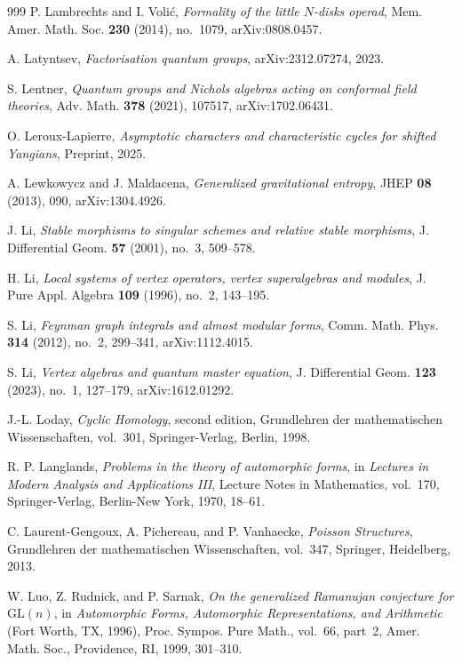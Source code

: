 \begin{thebibliography}{999}
P. Lambrechts and I. Voli\'c, \emph{Formality of the little $N$-disks operad}, Mem. Amer. Math. Soc. \textbf{230} (2014), no.~1079, arXiv:0808.0457.

A. Latyntsev, \emph{Factorisation quantum groups}, arXiv:2312.07274, 2023.

S. Lentner, \emph{Quantum groups and Nichols algebras acting on conformal field theories}, Adv. Math. \textbf{378} (2021), 107517, arXiv:1702.06431.

O. Leroux-Lapierre, \emph{Asymptotic characters and characteristic cycles for shifted Yangians}, Preprint, 2025.

A. Lewkowycz and J. Maldacena, \emph{Generalized gravitational entropy}, JHEP \textbf{08} (2013), 090, arXiv:1304.4926.

J. Li, \emph{Stable morphisms to singular schemes and relative stable morphisms}, J. Differential Geom. \textbf{57} (2001), no.~3, 509--578.

H. Li, \emph{Local systems of vertex operators, vertex superalgebras and modules}, J. Pure Appl. Algebra \textbf{109} (1996), no.~2, 143--195.

S. Li, \emph{Feynman graph integrals and almost modular forms}, Comm. Math. Phys. \textbf{314} (2012), no.~2, 299--341, arXiv:1112.4015.

S. Li, \emph{Vertex algebras and quantum master equation}, J. Differential Geom. \textbf{123} (2023), no.~1, 127--179, arXiv:1612.01292.

J.-L. Loday, \emph{Cyclic Homology}, second edition, Grundlehren der mathematischen Wissenschaften, vol.~301, Springer-Verlag, Berlin, 1998.

R. P. Langlands, \emph{Problems in the theory of automorphic forms},
in \emph{Lectures in Modern Analysis and Applications III}, Lecture
Notes in Mathematics, vol.~170, Springer-Verlag, Berlin-New York,
1970, 18--61.

C. Laurent-Gengoux, A. Pichereau, and P. Vanhaecke, \emph{Poisson Structures}, Grundlehren der mathematischen Wissenschaften, vol.~347, Springer, Heidelberg, 2013.

W. Luo, Z. Rudnick, and P. Sarnak, \emph{On the generalized Ramanujan
conjecture for $\mathrm{GL}(n)$}, in \emph{Automorphic Forms,
Automorphic Representations, and Arithmetic} (Fort Worth, TX, 1996),
Proc. Sympos. Pure Math., vol.~66, part~2, Amer. Math. Soc.,
Providence, RI, 1999, 301--310.


\end{thebibliography}
